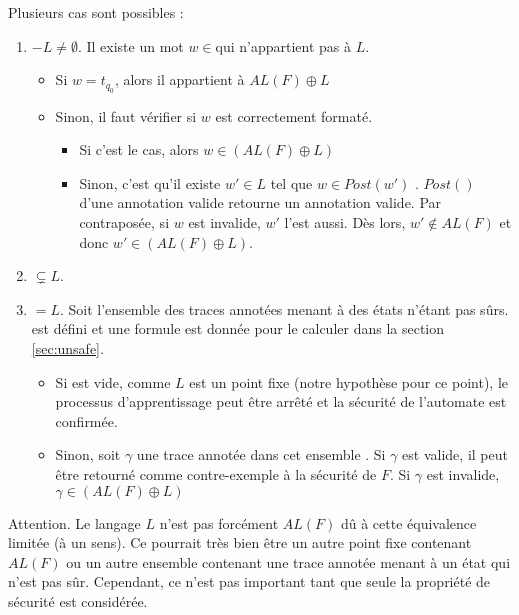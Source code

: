 Plusieurs cas sont possibles :
\begin{enumerate}
  \item \fl$-L\neq\emptyset$. Il existe un mot $w\in$\fl qui n'appartient pas à $L$.
  \begin{itemize}
    \item Si $w=t_{q_0}$, alors il appartient à $AL(F)\oplus L$
    \item Sinon, il faut vérifier si $w$ est correctement formaté.
      \begin{itemize}
          \item Si c'est le cas, alors $w\in(AL(F)\oplus L)$
          \item Sinon, c'est qu'il existe $w'\in L$ tel que $w\in Post(w')$ . $Post()$ d'une annotation valide retourne un annotation valide. Par contraposée, si $w$ est invalide, $w'$ l'est aussi. Dès lors, $w'\notin AL(F)$ et donc $w'\in(AL(F)\oplus L)$.
      \end{itemize}
  \end{itemize}
  \item \fl$\subsetneq L$. 
  \item \fl$=L$. Soit \wl l'ensemble des traces annotées menant à des états n'étant pas sûrs. \wl est défini et une formule est donnée pour le calculer dans la section \ref{sec:unsafe}.
  \begin{itemize}
    \item Si \wl est vide, comme $L$ est un point fixe (notre hypothèse pour ce point), le processus d'apprentissage peut être arrêté et la sécurité de l'automate est confirmée.
    \item Sinon, soit $\gamma$ une trace annotée dans cet ensemble \wl. Si $\gamma$ est valide, il peut être retourné comme contre-exemple à la sécurité de $F$. Si $\gamma$ est invalide, $\gamma\in(AL(F)\oplus L)$
  \end{itemize}
\end{enumerate}

Attention. Le langage $L$ n'est pas forcément $AL(F)$ dû à cette équivalence limitée (à un sens). Ce pourrait très bien être un autre point fixe contenant $AL(F)$ ou un autre ensemble contenant une trace annotée menant à un état qui n'est pas sûr. Cependant, ce n'est pas important tant que seule la propriété de sécurité est considérée.

